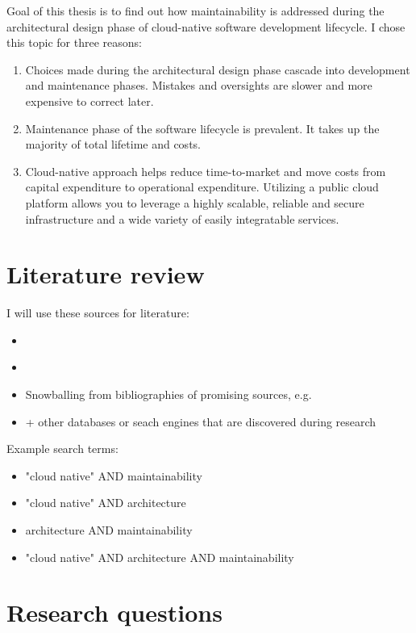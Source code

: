 \documentclass[utf8,english]{gradu3}
\begin{document}
Goal of this thesis is to find out how maintainability is addressed during the
architectural design phase of cloud-native software development lifecycle.
I chose this topic for three reasons:
\begin{enumerate}
  \item Choices made during the architectural design phase cascade into
        development and maintenance phases. Mistakes and oversights are
        slower and more expensive to correct later.
  \item Maintenance phase of the software lifecycle is prevalent.
        It takes up the majority of total lifetime and costs.
  \item Cloud-native approach helps reduce time-to-market and move costs from
        capital expenditure to operational expenditure. Utilizing a public cloud
        platform allows you to leverage a highly scalable, reliable and secure
        infrastructure and a wide variety of easily integratable services.
\end{enumerate}


\chapter{Literature review}
I will use these sources for literature:
\begin{itemize}
  \item \textcite{jykdok}
  \item \textcite{google-scholar}
  \item Snowballing from bibliographies of promising sources, e.g. \textcite{thesis-time-tracking}
  \item + other databases or seach engines that are discovered during research
\end{itemize}

Example search terms:
\begin{itemize}
  \item "cloud native" AND maintainability
  \item "cloud native" AND architecture
  \item architecture AND maintainability
  \item "cloud native" AND architecture AND maintainability
\end{itemize}


\chapter{Research questions}
\end{document}
